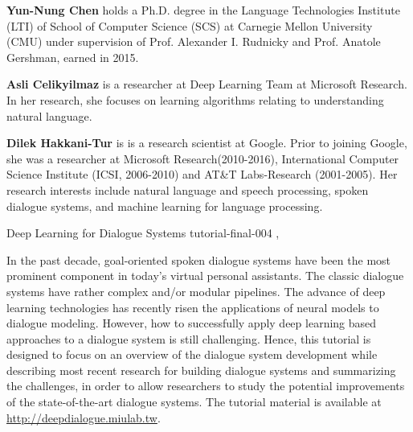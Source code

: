 \begin{bio}
  {\bfseries Yun-Nung Chen} holds a Ph.D. degree in the Language Technologies
  Institute (LTI) of School of Computer Science (SCS) at Carnegie Mellon
  University (CMU) under supervision of Prof. Alexander I. Rudnicky and
  Prof. Anatole Gershman, earned in 2015.

  {\bfseries Asli Celikyilmaz} is a researcher at Deep Learning Team at
  Microsoft Research. In her research, she focuses on learning algorithms
  relating to understanding natural language.

  {\bfseries Dilek Hakkani-Tur} is is a research scientist at Google. Prior
  to joining Google, she was a researcher at Microsoft Research(2010-2016),
  International Computer Science Institute (ICSI, 2006-2010) and AT\&T
  Labs-Research (2001-2005). Her research interests include natural language
  and speech processing, spoken dialogue systems, and machine learning for
  language processing.

\end{bio}

\begin{tutorial}
  {Deep Learning for Dialogue Systems}
  {tutorial-final-004}
  {\daydateyear, \tutorialafternoontime}
  {\TutLocD}

In the past decade, goal-oriented spoken dialogue systems have been the most
prominent component in today's virtual personal assistants. The classic
dialogue systems have rather complex and/or modular pipelines. The advance of
deep learning technologies has recently risen the applications of neural
models to dialogue modeling. However, how to successfully apply deep learning
based approaches to a dialogue system is still challenging. Hence, this
tutorial is designed to focus on an overview of the dialogue system
development while describing most recent research for building dialogue
systems and summarizing the challenges, in order to allow researchers to
study the potential improvements of the state-of-the-art dialogue systems. The
tutorial material is available at \url{http://deepdialogue.miulab.tw}.

\end{tutorial}
